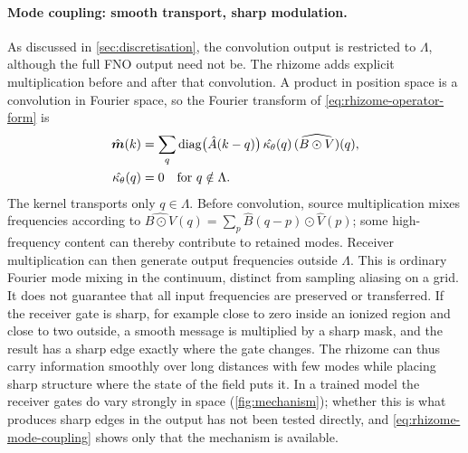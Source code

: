 \paragraph{Mode coupling: smooth transport, sharp modulation.} As discussed in \cref{sec:discretisation}, the convolution output is restricted to $\Lambda$, although the full FNO output need not be. The rhizome adds explicit multiplication before and after that convolution. A product in position space is a convolution in Fourier space, so the Fourier transform of \cref{eq:rhizome-operator-form} is
\begin{equation}
  \label{eq:rhizome-mode-coupling}
  \begin{aligned}
  \hat{\bm{m}}(k) &= \sum_{q}\operatorname{diag}\!\big(\hat A(k-q)\big)\,\hat{\kappa_\theta}(q)\,\widehat{(B\odot V)}(q),\\
  \hat{\kappa_\theta}(q) &= 0 \quad\text{for } q\notin\Lambda .
  \end{aligned}
\end{equation}
The kernel transports only $q\in\Lambda$. Before convolution, source multiplication mixes frequencies according to $\widehat{B\odot V}(q)=\sum_p\hat B(q-p)\odot\hat V(p)$; some high-frequency content can thereby contribute to retained modes. Receiver multiplication can then generate output frequencies outside $\Lambda$. This is ordinary Fourier mode mixing in the continuum, distinct from sampling aliasing on a grid. It does not guarantee that all input frequencies are preserved or transferred. If the receiver gate is sharp, for example close to zero inside an ionized region and close to two outside, a smooth message is multiplied by a sharp mask, and the result has a sharp edge exactly where the gate changes. The rhizome can thus carry information smoothly over long distances with few modes while placing sharp structure where the state of the field puts it. In a trained model the receiver gates do vary strongly in space (\cref{fig:mechanism}); whether this is what produces sharp edges in the output has not been tested directly, and \cref{eq:rhizome-mode-coupling} shows only that the mechanism is available.


